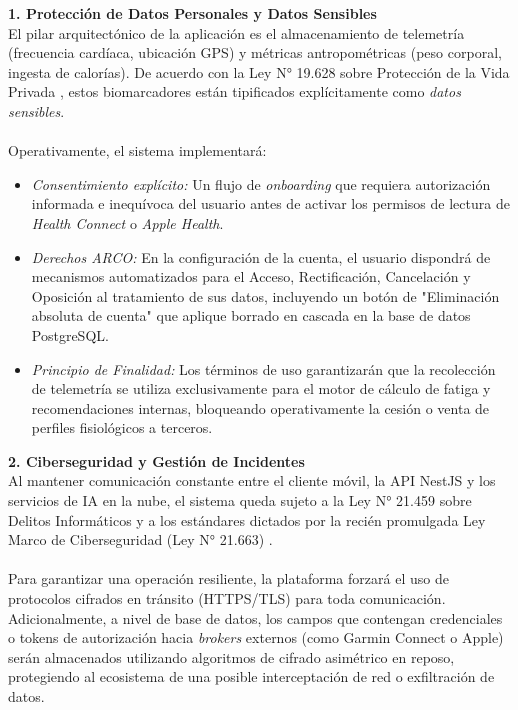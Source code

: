 \documentclass[12pt]{article}
\begin{document}
\textbf{1. Protección de Datos Personales y Datos Sensibles}\\
El pilar arquitectónico de la aplicación es el almacenamiento de telemetría (frecuencia cardíaca, ubicación GPS) y métricas antropométricas (peso corporal, ingesta de calorías). De acuerdo con la Ley N° 19.628 sobre Protección de la Vida Privada \citep{ley19628}, estos biomarcadores están tipificados explícitamente como \textit{datos sensibles}. 
\\\\
Operativamente, el sistema implementará:
\begin{itemize}
    \item \textit{Consentimiento explícito:} Un flujo de \textit{onboarding} que requiera autorización informada e inequívoca del usuario antes de activar los permisos de lectura de \textit{Health Connect} o \textit{Apple Health}.
    \item \textit{Derechos ARCO:} En la configuración de la cuenta, el usuario dispondrá de mecanismos automatizados para el Acceso, Rectificación, Cancelación y Oposición al tratamiento de sus datos, incluyendo un botón de "Eliminación absoluta de cuenta" que aplique borrado en cascada en la base de datos PostgreSQL.
    \item \textit{Principio de Finalidad:} Los términos de uso garantizarán que la recolección de telemetría se utiliza exclusivamente para el motor de cálculo de fatiga y recomendaciones internas, bloqueando operativamente la cesión o venta de perfiles fisiológicos a terceros.
\end{itemize}
\newpage
\textbf{2. Ciberseguridad y Gestión de Incidentes}\\
Al mantener comunicación constante entre el cliente móvil, la API NestJS y los servicios de IA en la nube, el sistema queda sujeto a la Ley N° 21.459 sobre Delitos Informáticos \citep{ley21459} y a los estándares dictados por la recién promulgada Ley Marco de Ciberseguridad (Ley N° 21.663) \citep{ley21663}.
\\\\
Para garantizar una operación resiliente, la plataforma forzará el uso de protocolos cifrados en tránsito (HTTPS/TLS) para toda comunicación. Adicionalmente, a nivel de base de datos, los campos que contengan credenciales o tokens de autorización hacia \textit{brokers} externos (como Garmin Connect o Apple) serán almacenados utilizando algoritmos de cifrado asimétrico en reposo, protegiendo al ecosistema de una posible interceptación de red o exfiltración de datos.
\end{document}
